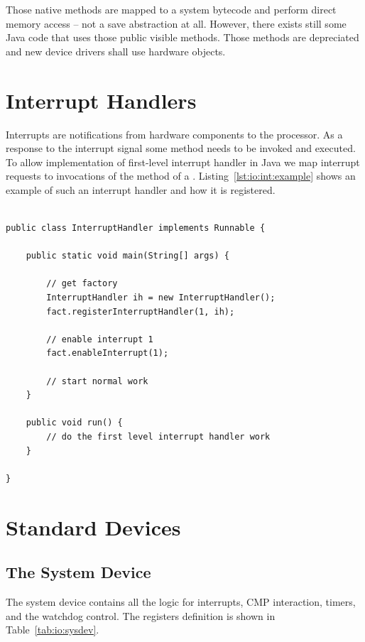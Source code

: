 Those native methods are mapped to a system bytecode and perform
direct memory access -- not a save abstraction at all. However, there
exists still some Java code that uses those public visible methods.
Those methods are depreciated and new device drivers shall use
hardware objects.

\section{Interrupt Handlers}


Interrupts are notifications from hardware components to the
processor. As a response to the interrupt signal some method needs to
be invoked and executed. To allow implementation of first-level
interrupt handler in Java we map interrupt requests to invocations of
the  method of a .
Listing~\ref{lst:io:int:example} shows an example of such an
interrupt handler and how it is registered.

\begin{lstlisting}[float=t,caption={A simple first-level interrupt handler in Java},
label=lst:io:int:example]

public class InterruptHandler implements Runnable {

    public static void main(String[] args) {

        // get factory
    	InterruptHandler ih = new InterruptHandler();
    	fact.registerInterruptHandler(1, ih);
    	
    	// enable interrupt 1
    	fact.enableInterrupt(1);

        // start normal work
    }

    public void run() {
    	// do the first level interrupt handler work
    }

}
\end{lstlisting}


\section{Standard Devices}


\subsection{The System Device}

The system device contains all the logic for interrupts, CMP
interaction, timers, and the watchdog control. The registers
definition is shown in Table~\ref{tab:io:sysdev}.

